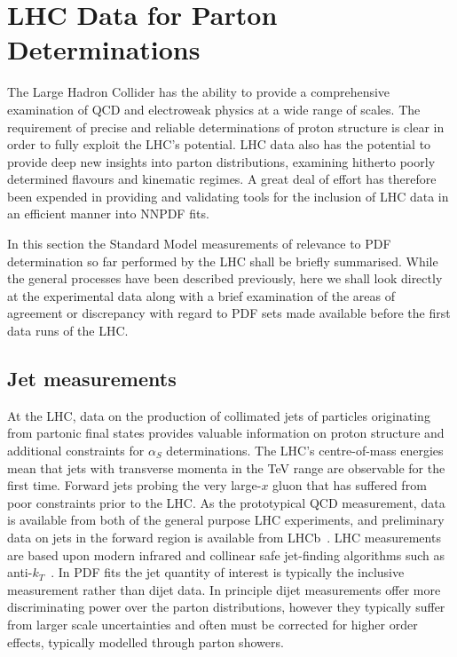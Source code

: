 \chapter{LHC Data for Parton Determinations}
\label{ch:LHCdata}
The Large Hadron Collider has the ability to provide a comprehensive examination of QCD and electroweak physics at a wide range of scales. The requirement of precise and reliable
determinations of proton structure is clear in order to fully exploit the LHC's potential. LHC data also has the potential to provide deep new insights into parton distributions, examining hitherto
poorly determined flavours and kinematic regimes. A great deal of effort has therefore been expended in providing and validating tools for the inclusion of LHC data in an efficient manner into
NNPDF fits.

In this section the Standard Model measurements of relevance to PDF determination so far performed by the LHC shall be briefly summarised. While the general processes have been described previously,
here we shall look directly at the experimental data along with a brief examination of the areas of agreement or discrepancy with regard to PDF sets made available before the first data runs of the LHC.

\section{Jet measurements}
At the LHC, data on the production of collimated jets of particles originating from partonic final states provides valuable information on proton structure and additional constraints for $\alpha_S$ determinations. The LHC's centre-of-mass energies
mean that jets with transverse momenta in the TeV range are observable for the first time. Forward jets probing the very large-$x$ gluon that has suffered from poor constraints prior to the LHC. As the prototypical QCD measurement, data
is available from both of the general purpose LHC experiments, and preliminary data on jets in the forward region is available from LHCb~\cite{LHCb:2011xqa}. LHC measurements are based upon modern infrared and collinear safe jet-finding algorithms such as anti-$k_T$~\cite{Cacciari:2008gp}. In PDF fits the jet quantity of interest is typically the inclusive measurement rather than dijet data. In principle dijet measurements offer more discriminating power over the parton distributions, however they typically suffer from larger scale uncertainties and often must be corrected for higher order effects, typically modelled through parton showers.

